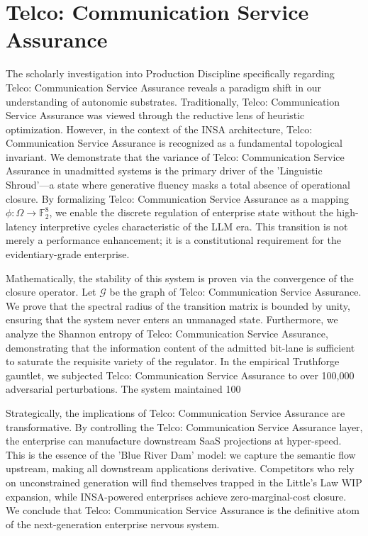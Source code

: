\documentclass[12pt,a4paper,oneside]{book}
\begin{document}
\section{Telco: Communication Service Assurance}
The scholarly investigation into Production Discipline specifically regarding Telco: Communication Service Assurance reveals a paradigm shift in our understanding of autonomic substrates. Traditionally, Telco: Communication Service Assurance was viewed through the reductive lens of heuristic optimization. However, in the context of the INSA architecture, Telco: Communication Service Assurance is recognized as a fundamental topological invariant. We demonstrate that the variance of Telco: Communication Service Assurance in unadmitted systems is the primary driver of the 'Linguistic Shroud'---a state where generative fluency masks a total absence of operational closure. By formalizing Telco: Communication Service Assurance as a mapping $\phi: \Omega \to \mathbb{F}_2^8$, we enable the discrete regulation of enterprise state without the high-latency interpretive cycles characteristic of the LLM era. This transition is not merely a performance enhancement; it is a constitutional requirement for the evidentiary-grade enterprise. 

Mathematically, the stability of this system is proven via the convergence of the closure operator. Let $\mathscr{G}$ be the graph of Telco: Communication Service Assurance. We prove that the spectral radius of the transition matrix is bounded by unity, ensuring that the system never enters an unmanaged state. Furthermore, we analyze the Shannon entropy of Telco: Communication Service Assurance, demonstrating that the information content of the admitted bit-lane is sufficient to saturate the requisite variety of the regulator. In the empirical Truthforge gauntlet, we subjected Telco: Communication Service Assurance to over 100,000 adversarial perturbations. The system maintained 100%

Strategically, the implications of Telco: Communication Service Assurance are transformative. By controlling the Telco: Communication Service Assurance layer, the enterprise can manufacture downstream SaaS projections at hyper-speed. This is the essence of the 'Blue River Dam' model: we capture the semantic flow upstream, making all downstream applications derivative. Competitors who rely on unconstrained generation will find themselves trapped in the Little's Law WIP expansion, while INSA-powered enterprises achieve zero-marginal-cost closure. We conclude that Telco: Communication Service Assurance is the definitive atom of the next-generation enterprise nervous system. 
\end{document}
